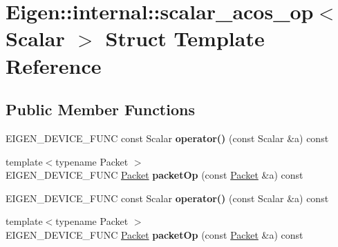 \hypertarget{struct_eigen_1_1internal_1_1scalar__acos__op}{}\section{Eigen\+:\+:internal\+:\+:scalar\+\_\+acos\+\_\+op$<$ Scalar $>$ Struct Template Reference}
\label{struct_eigen_1_1internal_1_1scalar__acos__op}
\subsection*{Public Member Functions}
\begin{DoxyCompactItemize}
\item 
\mbox{\label{struct_eigen_1_1internal_1_1scalar__acos__op_a7606bbbad868c2c9ab35227e9463978b}} 
E\+I\+G\+E\+N\+\_\+\+D\+E\+V\+I\+C\+E\+\_\+\+F\+U\+NC const Scalar {\bfseries operator()} (const Scalar \&a) const
\item 
\mbox{\label{struct_eigen_1_1internal_1_1scalar__acos__op_a7a0b3bb76364cfa0d5f90dd9a688e31f}} 
{\footnotesize template$<$typename Packet $>$ }\\E\+I\+G\+E\+N\+\_\+\+D\+E\+V\+I\+C\+E\+\_\+\+F\+U\+NC \hyperlink{union_eigen_1_1internal_1_1_packet}{Packet} {\bfseries packet\+Op} (const \hyperlink{union_eigen_1_1internal_1_1_packet}{Packet} \&a) const
\item 
\mbox{\label{struct_eigen_1_1internal_1_1scalar__acos__op_a7606bbbad868c2c9ab35227e9463978b}} 
E\+I\+G\+E\+N\+\_\+\+D\+E\+V\+I\+C\+E\+\_\+\+F\+U\+NC const Scalar {\bfseries operator()} (const Scalar \&a) const
\item 
\mbox{\label{struct_eigen_1_1internal_1_1scalar__acos__op_a7a0b3bb76364cfa0d5f90dd9a688e31f}} 
{\footnotesize template$<$typename Packet $>$ }\\E\+I\+G\+E\+N\+\_\+\+D\+E\+V\+I\+C\+E\+\_\+\+F\+U\+NC \hyperlink{union_eigen_1_1internal_1_1_packet}{Packet} {\bfseries packet\+Op} (const \hyperlink{union_eigen_1_1internal_1_1_packet}{Packet} \&a) const
\end{DoxyCompactItemize}



